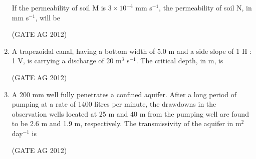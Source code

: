 \documentclass[journal]{IEEEtran}
\begin{document}
\begin{enumerate}
\medskip

If the permeability of soil M is $3\times 10^{-4}$ mm s$^{-1}$, the permeability of soil N, in mm s$^{-1}$, will be
\begin{enumerate}
\end{enumerate}
\hfill(GATE AG 2012)\\

\medskip

\item
 A trapezoidal canal, having a bottom width of 5.0 m and a side slope of 1 H : 1 V, is carrying a discharge of 20 m$^3$ s$^{-1}$. The critical depth, in m, is
\begin{enumerate}
\end{enumerate}
\hfill(GATE AG 2012)\\

\medskip

\item
 A 200 mm well fully penetrates a confined aquifer. After a long period of pumping at a rate of 1400 litres per minute, the drawdowns in the observation wells located at 25 m and 40 m from the pumping well are found to be 2.6 m and 1.9 m, respectively. The transmissivity of the aquifer in m$^2$ day$^{-1}$ is
\begin{enumerate}
\end{enumerate}
\hfill(GATE AG 2012)\\

\medskip


\end{enumerate}
\end{document}
